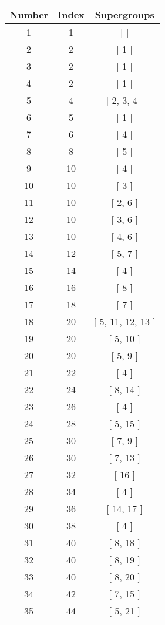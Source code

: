 \begin{center}
\begin{longtable}[H]{|| c c c ||}
\hline
Number & Index & Supergroups \\ 
\hline
1 & 1 & [ ] \\ 
\hline
2 & 2 & [ 1 ] \\ 
\hline
3 & 2 & [ 1 ] \\ 
\hline
4 & 2 & [ 1 ] \\ 
\hline
5 & 4 & [ 2, 3, 4 ] \\ 
\hline
6 & 5 & [ 1 ] \\ 
\hline
7 & 6 & [ 4 ] \\ 
\hline
8 & 8 & [ 5 ] \\ 
\hline
9 & 10 & [ 4 ] \\ 
\hline
10 & 10 & [ 3 ] \\ 
\hline
11 & 10 & [ 2, 6 ] \\ 
\hline
12 & 10 & [ 3, 6 ] \\ 
\hline
13 & 10 & [ 4, 6 ] \\ 
\hline
14 & 12 & [ 5, 7 ] \\ 
\hline
15 & 14 & [ 4 ] \\ 
\hline
16 & 16 & [ 8 ] \\ 
\hline
17 & 18 & [ 7 ] \\ 
\hline
18 & 20 & [ 5, 11, 12, 13 ] \\ 
\hline
19 & 20 & [ 5, 10 ] \\ 
\hline
20 & 20 & [ 5, 9 ] \\ 
\hline
21 & 22 & [ 4 ] \\ 
\hline
22 & 24 & [ 8, 14 ] \\ 
\hline
23 & 26 & [ 4 ] \\ 
\hline
24 & 28 & [ 5, 15 ] \\ 
\hline
25 & 30 & [ 7, 9 ] \\ 
\hline
26 & 30 & [ 7, 13 ] \\ 
\hline
27 & 32 & [ 16 ] \\ 
\hline
28 & 34 & [ 4 ] \\ 
\hline
29 & 36 & [ 14, 17 ] \\ 
\hline
30 & 38 & [ 4 ] \\ 
\hline
31 & 40 & [ 8, 18 ] \\ 
\hline
32 & 40 & [ 8, 19 ] \\ 
\hline
33 & 40 & [ 8, 20 ] \\ 
\hline
34 & 42 & [ 7, 15 ] \\ 
\hline
35 & 44 & [ 5, 21 ] \\ 

\end{longtable}
\end{center}

